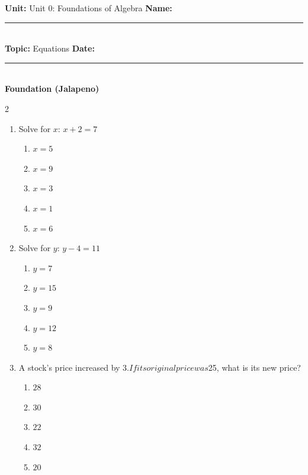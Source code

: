 \documentclass[10pt]{article}
\begin{document}
\enlargethispage{2.5cm}

\begin{tcolorbox}[colback=mainblue!5, colframe=mainblue, sharp corners, boxrule=0.5pt]
    \small \textbf{Unit:} Unit 0: Foundations of Algebra \hfill \textbf{Name:} \rule{3cm}{0.4pt} \\
    \small \textbf{Topic:} Equations \hfill \textbf{Date:} \rule{2cm}{0.4pt} \\
    \centering \textbf{\large Foundation (Jalapeno)}
\end{tcolorbox}

\vspace{0.2cm}

\begin{multicols}{2}
\begin{enumerate}[label=\textbf{Q\arabic*.}, leftmargin=*, itemsep=6pt, parsep=0pt]

  \item \small Solve for $x$: $x + 2 = 7$
  \begin{enumerate}[label=(\Alph*), leftmargin=0.6cm, nosep, itemsep=2pt]
    \item $x = 5$
    \item $x = 9$
    \item $x = 3$
    \item $x = 1$
    \item $x = 6$
  \end{enumerate}

  \item \small Solve for $y$: $y - 4 = 11$
  \begin{enumerate}[label=(\Alph*), leftmargin=0.6cm, nosep, itemsep=2pt]
    \item $y = 7$
    \item $y = 15$
    \item $y = 9$
    \item $y = 12$
    \item $y = 8$
  \end{enumerate}

  \item \small A stock's price increased by $3. If its original price was $25, what is its new price?
  \begin{enumerate}[label=(\Alph*), leftmargin=0.6cm, nosep, itemsep=2pt]
    \item $28$
    \item $30$
    \item $22$
    \item $32$
    \item $20$
  \end{enumerate}


\end{enumerate}
\end{multicols}
\end{document}
